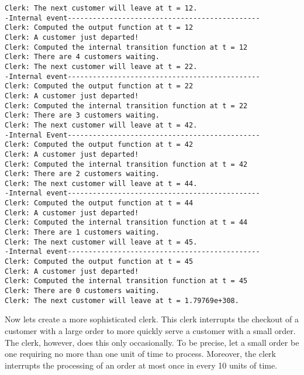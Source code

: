 \begin{verbatim}
Clerk: The next customer will leave at t = 12.
-Internal event----------------------------------------------
Clerk: Computed the output function at t = 12
Clerk: A customer just departed!
Clerk: Computed the internal transition function at t = 12
Clerk: There are 4 customers waiting.
Clerk: The next customer will leave at t = 22.
-Internal event----------------------------------------------
Clerk: Computed the output function at t = 22
Clerk: A customer just departed!
Clerk: Computed the internal transition function at t = 22
Clerk: There are 3 customers waiting.
Clerk: The next customer will leave at t = 42.
-Internal Event----------------------------------------------
Clerk: Computed the output function at t = 42
Clerk: A customer just departed!
Clerk: Computed the internal transition function at t = 42
Clerk: There are 2 customers waiting.
Clerk: The next customer will leave at t = 44.
-Internal event----------------------------------------------
Clerk: Computed the output function at t = 44
Clerk: A customer just departed!
Clerk: Computed the internal transition function at t = 44
Clerk: There are 1 customers waiting.
Clerk: The next customer will leave at t = 45.
-Internal event----------------------------------------------
Clerk: Computed the output function at t = 45
Clerk: A customer just departed!
Clerk: Computed the internal transition function at t = 45
Clerk: There are 0 customers waiting.
Clerk: The next customer will leave at t = 1.79769e+308.
\end{verbatim}

Now lets create a more sophisticated clerk. This clerk interrupts the checkout of a customer with a large order to more quickly serve a customer with a small order. The clerk, however, does this only occasionally. To be precise, let a small order be one requiring no more than one unit of time to process. Moreover, the clerk interrupts the processing of an order at most once in every 10 units of time.

